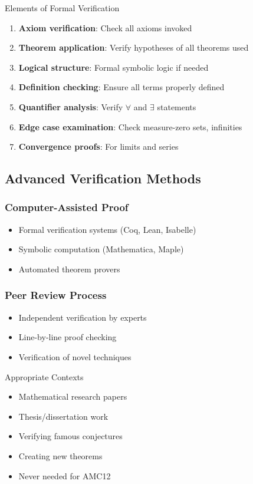 \documentclass{article}
\begin{document}
\begin{formalbox}{Elements of Formal Verification}
\begin{enumerate}
\item \textbf{Axiom verification}: Check all axioms invoked
\item \textbf{Theorem application}: Verify hypotheses of all theorems used
\item \textbf{Logical structure}: Formal symbolic logic if needed
\item \textbf{Definition checking}: Ensure all terms properly defined
\item \textbf{Quantifier analysis}: Verify $\forall$ and $\exists$ statements
\item \textbf{Edge case examination}: Check measure-zero sets, infinities
\item \textbf{Convergence proofs}: For limits and series
\end{enumerate}
\end{formalbox}

\subsection{Advanced Verification Methods}

\subsubsection{Computer-Assisted Proof}
\begin{itemize}
\item Formal verification systems (Coq, Lean, Isabelle)
\item Symbolic computation (Mathematica, Maple)
\item Automated theorem provers
\end{itemize}

\subsubsection{Peer Review Process}
\begin{itemize}
\item Independent verification by experts
\item Line-by-line proof checking
\item Verification of novel techniques
\end{itemize}

\begin{contextbox}{Appropriate Contexts}
\begin{itemize}[nosep]
\item Mathematical research papers
\item Thesis/dissertation work
\item Verifying famous conjectures
\item Creating new theorems
\item Never needed for AMC12
\end{itemize}
\end{contextbox}
\end{document}
